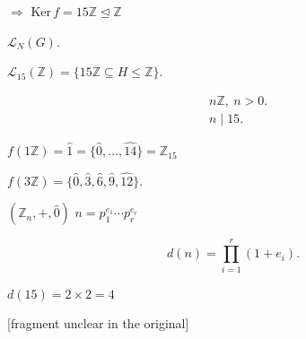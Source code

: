 \documentclass[12pt]{article}
\begin{document}
\noindent $\Rightarrow$ Ker$\,f = 15\mathbb{Z} \trianglelefteq \mathbb{Z}$

\bigskip
\noindent $\mathcal{L}_N(G)$.

\noindent $\mathcal{L}_{15}(\mathbb{Z}) = \{15\mathbb{Z}\subseteq H\leq \mathbb{Z}\}$.

\[
\begin{aligned}
&n\mathbb{Z}, \ n>0.\\
&n\mid 15.
\end{aligned}
\]

\bigskip
\noindent $f(1\mathbb{Z}) = \hat 1 = \{\hat 0,\ldots,\hat{14}\} = \mathbb{Z}_{15}$

\noindent $f(3\mathbb{Z}) = \{\hat 0,\hat 3,\hat 6,\hat 9,\hat{12}\}$.

\bigskip
\noindent $(\mathbb{Z}_n,+,\hat 0)$ \quad $n=p_1^{e_1}\cdots p_r^{e_r}$

\[
d(n) = \prod_{i=1}^{r}(1+e_i).
\]

\noindent $d(15) = 2\times 2 = 4$

\noindent \footnotesize [fragment unclear in the original]\normalsize
\end{document}
